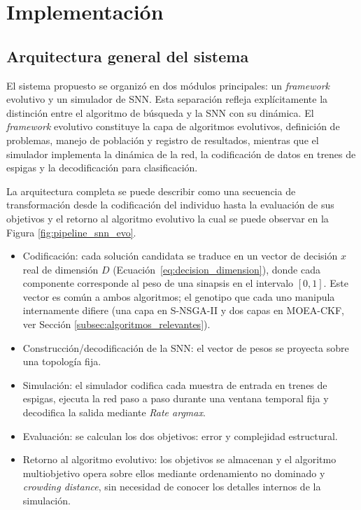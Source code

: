 \chapter{Implementación}\label{cap:implementacion}

\section{Arquitectura general del sistema}\label{sec:arqui_sistema}
El sistema propuesto se organizó en dos módulos principales: un \textit{framework} evolutivo y un simulador de SNN. Esta separación refleja explícitamente la distinción entre el algoritmo de búsqueda y la SNN con su dinámica. El \textit{framework} evolutivo constituye la capa de algoritmos evolutivos, definición de problemas, manejo de población y registro de resultados, mientras que el simulador implementa la dinámica de la red, la codificación de datos en trenes de espigas y la decodificación para clasificación.


La arquitectura completa se puede describir como una secuencia de transformación desde la codificación del individuo hasta la evaluación de sus objetivos y el retorno al algoritmo evolutivo la cual se puede observar en la Figura \ref{fig:pipeline_snn_evo}.

\begin{itemize}
    \item Codificación: cada solución candidata se traduce en un vector de decisión $x$ real de dimensión $D$ (Ecuación~\ref{eq:decision_dimension}), donde cada componente corresponde al peso de una sinapsis en el intervalo $[0,1]$. Este vector es común a ambos algoritmos; el genotipo que cada uno manipula internamente difiere (una capa en S-NSGA-II y dos capas en MOEA-CKF, ver Sección \ref{subsec:algoritmos_relevantes}).

    \item Construcción/decodificación de la SNN: el vector de pesos se proyecta sobre una topología fija.

    \item Simulación: el simulador codifica cada muestra de entrada en trenes de espigas, ejecuta la red paso a paso durante una ventana temporal fija y decodifica la salida mediante \textit{Rate argmax}.

    \item Evaluación: se calculan los dos objetivos: error y complejidad estructural.

    \item Retorno al algoritmo evolutivo: los objetivos se almacenan y el algoritmo multiobjetivo opera sobre ellos mediante ordenamiento no dominado y \textit{crowding distance}, sin necesidad de conocer los detalles internos de la simulación.
\end{itemize}


